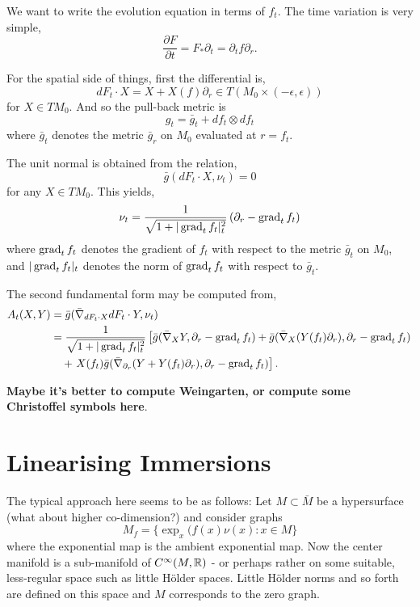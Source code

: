 \documentclass{amsart}
\begin{document}
We want to write the evolution equation in terms of \(f_t\). The time variation is very simple,
\[
\frac{\partial F}{\partial t} = F_{\ast} \partial_t = \partial_t f \partial_r.
\]

For the spatial side of things, first the differential is,
\[
dF_t \cdot X = X + X(f) \partial_r \in T(M_0 \times (-\epsilon, \epsilon))
\]
for \(X \in TM_0\). And so the pull-back metric is
\[
g_t = \bar{g}_t + df_t \otimes df_t
\]
where \(\bar{g}_t\) denotes the metric \(\bar{g}_r\) on \(M_0\) evaluated at \(r = f_t\).

The unit normal is obtained from the relation,
\[
\bar{g} (dF_t \cdot X, \nu_t) = 0
\]
for any \(X \in TM_0\). This yields,
\[
\nu_t = \frac{1}{\sqrt{1 + |\operatorname{grad}_t f_t|_t^2}} \left(\partial_r - \operatorname{grad}_t f_t\right)
\]
where \(\operatorname{grad}_t f_t\) denotes the gradient of \(f_t\) with respect to the metric \(\bar{g}_t\) on \(M_0\), and \(|\operatorname{grad}_t f_t|_t\) denotes the norm of \(\operatorname{grad}_t f_t\) with respect to \(\bar{g}_t\).

The second fundamental form may be computed from,
\begin{align*}
A_t (X, Y) &= \bar{g} (\bar{\nabla}_{dF_t \cdot X} dF_t \cdot Y, \nu_t) \\
&= \frac{1}{\sqrt{1 + |\operatorname{grad}_t f_t|_t^2}} \left[\bar{g}(\bar{\nabla}_X Y, \partial_r - \operatorname{grad}_t f_t) + \bar{g}(\bar{\nabla}_X (Y(f_t) \partial_r), \partial_r - \operatorname{grad}_t f_t)\right. \\
&\quad + \left.X(f_t) \bar{g} (\bar{\nabla}_{\partial_r} (Y + Y(f_t) \partial_r), \partial_r - \operatorname{grad}_t f_t)\right].
\end{align*}

\textbf{Maybe it's better to compute Weingarten, or compute some Christoffel symbols here}.

\section{Linearising Immersions}
\label{sec:linearising_immersions}

The typical approach here seems to be as follows: Let \(M \subset \bar{M}\) be a hypersurface (what about higher co-dimension?) and consider graphs
\[
M_f = \{\exp_x(f(x)\nu(x) : x \in M\}
\]
where the exponential map is the ambient exponential map. Now the center manifold is a sub-manifold of \(C^{\infty}(M, \mathbb{R})\) - or perhaps rather on some suitable, less-regular space such as little H\"older spaces. Little H\"older norms and so forth are defined on this space and \(M\) corresponds to the zero graph.
\end{document}
